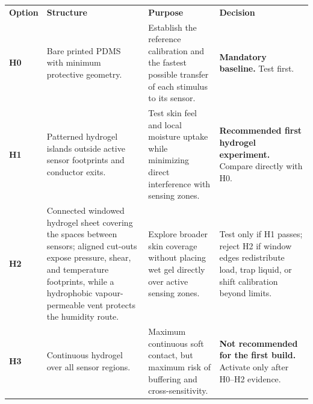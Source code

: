 \begingroup
\fontsize{8.75}{10.3}\selectfont
\renewcommand{\arraystretch}{1.14}
\begin{tabularx}{\linewidth}{>{\centering\arraybackslash\bfseries\color{AUBRed}}p{1.05cm}>{\raggedright\arraybackslash}p{3.3cm}Y Y}
\color{white}\textbf{Option} &
\color{white}\textbf{Structure} &
\color{white}\textbf{Purpose} &
\color{white}\textbf{Decision} \\
H0 & Bare printed PDMS with minimum protective geometry. &
Establish the reference calibration and the fastest possible transfer of each
stimulus to its sensor. & \textbf{Mandatory baseline.} Test first. \\
H1 & Patterned hydrogel islands outside active sensor footprints and conductor
exits. & Test skin feel and local moisture uptake while minimizing
direct interference with sensing zones. & \textbf{Recommended first hydrogel
experiment.} Compare directly with H0. \\
H2 & Connected windowed hydrogel sheet covering the spaces between sensors;
aligned cut-outs expose pressure, shear, and temperature footprints, while a
hydrophobic vapour-permeable vent protects the humidity route. & Explore broader
skin coverage without placing wet gel directly over active sensing zones. & Test
only if H1 passes; reject H2 if window edges redistribute load, trap liquid, or
shift calibration beyond limits. \\
H3 & Continuous hydrogel over all sensor regions. & Maximum continuous soft
contact, but maximum risk of buffering and cross-sensitivity. & \textbf{Not
recommended for the first build.} Activate only after H0--H2 evidence. \\
\end{tabularx}
\endgroup
{}

\vspace{0.65em}

\clearpage
{}

